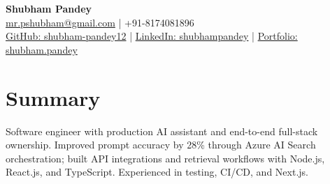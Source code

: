 \documentclass[a4paper,10pt]{article}
\begin{document}
\begin{center}
{\LARGE\textbf{Shubham Pandey}}\\[3pt]
\href{mailto:mr.pshubham@gmail.com}{mr.pshubham@gmail.com} | +91-8174081896\\[2pt]
\href{https://github.com/shubham-pandey12}{GitHub: shubham-pandey12} | \href{https://www.linkedin.com/in/shubham-pandey-a74716199/}{LinkedIn: shubhampandey} | \href{https://shubham-portfolio-mocha.vercel.app/}{Portfolio: shubham.pandey}
\end{center}
\section{Summary}
Software engineer with production AI assistant and end-to-end full-stack ownership. Improved prompt accuracy by 28\% through Azure AI Search orchestration; built API integrations and retrieval workflows with Node.js, React.js, and TypeScript. Experienced in testing, CI/CD, and Next.js.
\end{document}
